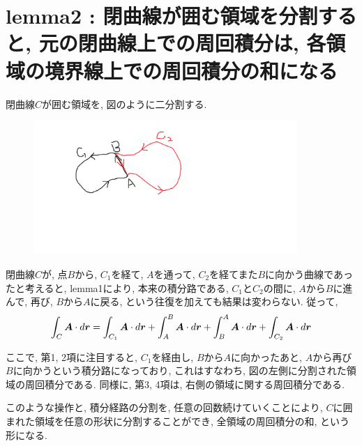 \documentclass{jsarticle}
\newcommand*{\mbold}[1]{\mbox{\boldmath $#1$}}
\begin{document}
\section{lemma2 : 閉曲線が囲む領域を分割すると, 元の閉曲線上での周回積分は, 各領域の境界線上での周回積分の和になる}
閉曲線$C$が囲む領域を, 図のように二分割する. 
\begin{figure}[htbp]
  \begin{center}
    \includegraphics[width=10cm]{Figure/ClosedLoopDivide.png}
  \end{center}
\end{figure}

閉曲線$C$が, 点$B$から, $C_1$を経て, $A$を通って, $C_2$を経てまた$B$に向かう曲線であったと考えると, lemma1により, 本来の積分路である, $C_1$と$C_2$の間に, 
$A$から$B$に進んで, 再び, $B$から$A$に戻る, という往復を加えても結果は変わらない. 
従って, 
\begin{equation}
  \int_C \mbold{A}\cdot d\mbold{r}
  = \int_{C_1} \mbold{A}\cdot d\mbold{r} 
  + \int_{A}^{B} \mbold{A}\cdot d\mbold{r} 
  + \int_{B}^{A} \mbold{A}\cdot d\mbold{r} 
  + \int_{C_2} \mbold{A}\cdot d\mbold{r} 
\end{equation}

ここで, 第1, 2項に注目すると, $C_1$を経由し, $B$から$A$に向かったあと, $A$から再び$B$に向かうという積分路になっており, 
これはすなわち, 図の左側に分割された領域の周回積分である. 
同様に, 第3, 4項は, 右側の領域に関する周回積分である. 

このような操作と, 積分経路の分割を, 任意の回数続けていくことにより, $C$に囲まれた領域を任意の形状に分割することができ, 
全領域の周回積分の和, という形になる. 
\end{document}
